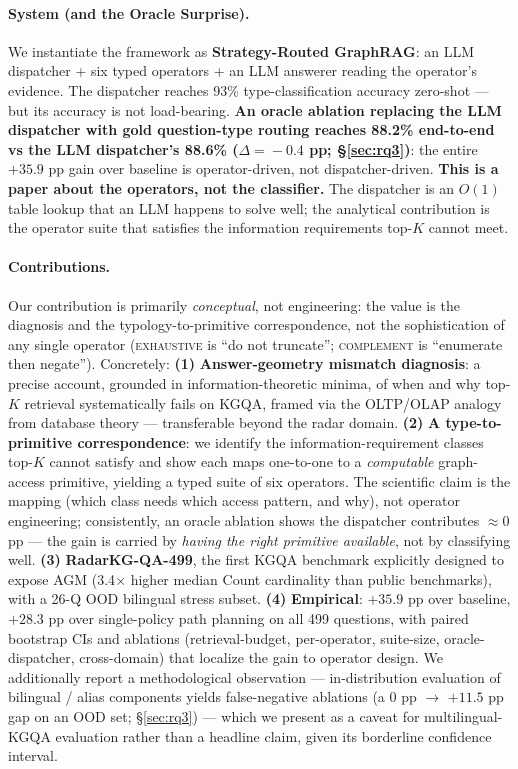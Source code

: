 \documentclass[11pt,a4paper]{article}
\newcommand{\op}[1]{\textsc{\small #1}}
\begin{document}
\paragraph{System (and the Oracle Surprise).}
We instantiate the framework as \textbf{Strategy-Routed GraphRAG}: an LLM dispatcher + six typed operators + an LLM answerer reading the operator's evidence. The dispatcher reaches 93\% type-classification accuracy zero-shot --- but its accuracy is not load-bearing. \textbf{An oracle ablation replacing the LLM dispatcher with gold question-type routing reaches 88.2\% end-to-end vs the LLM dispatcher's 88.6\% ($\Delta\!=\!-0.4$ pp; §\ref{sec:rq3})}: the entire $+35.9$ pp gain over baseline is operator-driven, not dispatcher-driven. \textbf{This is a paper about the operators, not the classifier.} The dispatcher is an $O(1)$ table lookup that an LLM happens to solve well; the analytical contribution is the operator suite that satisfies the information requirements top-$K$ cannot meet.

\paragraph{Contributions.}
Our contribution is primarily \emph{conceptual}, not engineering: the value is the diagnosis and the typology-to-primitive correspondence, not the sophistication of any single operator (\op{exhaustive} is ``do not truncate''; \op{complement} is ``enumerate then negate''). Concretely:
\textbf{(1)} \textbf{Answer-geometry mismatch diagnosis}: a precise account, grounded in information-theoretic minima, of when and why top-$K$ retrieval systematically fails on KGQA, framed via the OLTP/OLAP analogy from database theory --- transferable beyond the radar domain.
\textbf{(2)} \textbf{A type-to-primitive correspondence}: we identify the information-requirement classes top-$K$ cannot satisfy and show each maps one-to-one to a \emph{computable} graph-access primitive, yielding a typed suite of six operators. The scientific claim is the mapping (which class needs which access pattern, and why), not operator engineering; consistently, an oracle ablation shows the dispatcher contributes ${\approx}0$ pp --- the gain is carried by \emph{having the right primitive available}, not by classifying well.
\textbf{(3)} \textbf{RadarKG-QA-499}, the first KGQA benchmark explicitly designed to expose AGM (3.4$\times$ higher median Count cardinality than public benchmarks), with a 26-Q OOD bilingual stress subset.
\textbf{(4)} \textbf{Empirical}: $+35.9$ pp over baseline, $+28.3$ pp over single-policy path planning on all 499 questions, with paired bootstrap CIs and ablations (retrieval-budget, per-operator, suite-size, oracle-dispatcher, cross-domain) that localize the gain to operator design.
We additionally report a methodological observation --- in-distribution evaluation of bilingual / alias components yields false-negative ablations (a 0 pp $\to$ $+11.5$ pp gap on an OOD set; §\ref{sec:rq3}) --- which we present as a caveat for multilingual-KGQA evaluation rather than a headline claim, given its borderline confidence interval.
\end{document}
